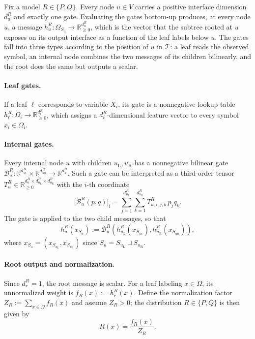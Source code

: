 \documentclass{article}
\begin{document}
Fix a model $R\in\{P,Q\}$. Every node $u\in V$ carries a positive interface dimension $d_u^R$ and exactly one gate. Evaluating the gates bottom-up produces, at every node $u$, a message $h_u^R:\Omega_{S_u}\to\mathbb R_{\geq0}^{d_u^R}$, which is the vector that the subtree rooted at $u$ exposes on its output interface as a function of the leaf labels below $u$. The gates fall into three types according to the position of $u$ in $\mathcal{T}$: a leaf reads the observed symbol, an internal node combines the two messages of its children bilinearly, and the root does the same but outputs a scalar.

\paragraph{Leaf gates.}
If a leaf $\ell$ corresponds to variable $X_i$, its gate is a nonnegative lookup table $h_\ell^R:\Omega_i\to\mathbb R_{\geq0}^{d_\ell^R}$, which assigns a $d_\ell^R$-dimensional feature vector to every symbol $x_i\in\Omega_i$.

\paragraph{Internal gates.}
Every internal node $u$ with children $u_{\mathrm L},u_{\mathrm R}$ has a nonnegative bilinear gate $\mathcal B_u^R:\mathbb R^{d_{u_{\mathrm L}}^R}\times\mathbb R^{d_{u_{\mathrm R}}^R}\to\mathbb R^{d_u^R}$. Such a gate can be interpreted as a third-order tensor $T_u^R\in\mathbb R_{\geq0}^{d_u^R\times d_{u_{\mathrm L}}^R\times d_{u_{\mathrm R}}^R}$ with the $i$-th coordinate
\begin{equation*}
\bigl[\mathcal B_u^R(p,q)\bigr]_i = \sum_{j=1}^{d_{u_{\mathrm L}}^R}\sum_{k=1}^{d_{u_{\mathrm R}}^R} T_{u,i,j,k}^R\,p_jq_k .
\end{equation*}
The gate is applied to the two child messages, so that
$$
h_u^R(x_{S_u}) := \mathcal B_u^R\!\left(h_{u_{\mathrm L}}^R(x_{S_{u_{\mathrm L}}}), h_{u_{\mathrm R}}^R(x_{S_{u_{\mathrm R}}})\right),
$$
where $x_{S_u}=(x_{S_{u_{\mathrm L}}},x_{S_{u_{\mathrm R}}})$ since $S_u=S_{u_{\mathrm L}}\sqcup S_{u_{\mathrm R}}$.

\paragraph{Root output and normalization.}
Since $d_r^R=1$, the root message is scalar. For a leaf labeling $x\in\Omega$, its unnormalized weight is $f_R(x):=h_r^R(x)$. Define the normalization factor $Z_R:=\sum_{x\in\Omega}f_R(x)$ and assume $Z_R>0$; the distribution $R\in\{P,Q\}$ is then given by
$$
R(x) = \frac{f_R(x)}{Z_R}.
$$
\end{document}
